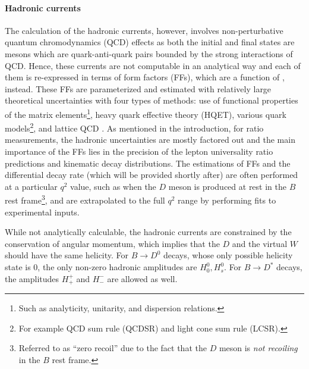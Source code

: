 \paragraph{Hadronic currents}
The calculation of the hadronic currents, however,
involves non-perturbative quantum chromodynamics (QCD) effects as both the
initial and final states are mesons which are quark-anti-quark pairs bounded by
the strong interactions of QCD.
Hence, these currents are not computable in an analytical way and each of them
is re-expressed in terms of form factors (FFs),
which are a function of \qSq, instead.
These FFs are parameterized and estimated with relatively large theoretical
uncertainties with four types of methods:
use of functional properties of the matrix elements\footnote{
    Such as analyticity, unitarity, and dispersion relations.
},
heavy quark effective theory (HQET),
various quark models\footnote{
    For example QCD sum rule (QCDSR) and light cone sum rule (LCSR).
},
and lattice QCD
\cite{Bernlochner_2022}.
As mentioned in the introduction,
for \RDX ratio measurements,
the hadronic uncertainties are mostly factored out and the main importance
of the FFs lies in the precision of the lepton universality ratio predictions
and kinematic decay distributions.
The estimations of FFs
and the differential decay rate (which will be provided shortly after)
are often performed at a particular $q^2$ value, such as when the $D$ meson is
produced at rest in the $B$ rest frame\footnote{
    Referred to as ``zero recoil'' due to the fact that the $D$ meson is
    \emph{not recoiling} in the $B$ rest frame.
},
and are extrapolated to the full $q^2$ range by performing fits to experimental
inputs.

While not analytically calculable,
the hadronic currents are constrained by the conservation of angular momentum,
which implies that the $D$ and the virtual $W$ should have the same helicity.
For $B \rightarrow D^0$ decays,
whose only possible helicity state is 0,
the only non-zero hadronic amplitudes are $H^0_0, H^0_s$.
For $B \rightarrow D^*$ decays,
the amplitudes $H^+_+$ and $H^-_-$ are allowed as well.

